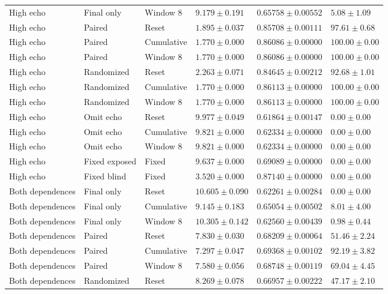\begin{longtable}{@{}llllll@{}}
High echo & Final only & Window 8 & $9.179 \pm 0.191$ & $0.65758 \pm 0.00552$ & $5.08 \pm 1.09$ \\
High echo & Paired & Reset & $1.895 \pm 0.037$ & $0.85708 \pm 0.00111$ & $97.61 \pm 0.68$ \\
High echo & Paired & Cumulative & $1.770 \pm 0.000$ & $0.86086 \pm 0.00000$ & $100.00 \pm 0.00$ \\
High echo & Paired & Window 8 & $1.770 \pm 0.000$ & $0.86086 \pm 0.00000$ & $100.00 \pm 0.00$ \\
High echo & Randomized & Reset & $2.263 \pm 0.071$ & $0.84645 \pm 0.00212$ & $92.68 \pm 1.01$ \\
High echo & Randomized & Cumulative & $1.770 \pm 0.000$ & $0.86113 \pm 0.00000$ & $100.00 \pm 0.00$ \\
High echo & Randomized & Window 8 & $1.770 \pm 0.000$ & $0.86113 \pm 0.00000$ & $100.00 \pm 0.00$ \\
High echo & Omit echo & Reset & $9.977 \pm 0.049$ & $0.61864 \pm 0.00147$ & $0.00 \pm 0.00$ \\
High echo & Omit echo & Cumulative & $9.821 \pm 0.000$ & $0.62334 \pm 0.00000$ & $0.00 \pm 0.00$ \\
High echo & Omit echo & Window 8 & $9.821 \pm 0.000$ & $0.62334 \pm 0.00000$ & $0.00 \pm 0.00$ \\
High echo & Fixed exposed & Fixed & $9.637 \pm 0.000$ & $0.69089 \pm 0.00000$ & $0.00 \pm 0.00$ \\
High echo & Fixed blind & Fixed & $3.520 \pm 0.000$ & $0.87140 \pm 0.00000$ & $0.00 \pm 0.00$ \\
Both dependences & Final only & Reset & $10.605 \pm 0.090$ & $0.62261 \pm 0.00284$ & $0.00 \pm 0.00$ \\
Both dependences & Final only & Cumulative & $9.145 \pm 0.183$ & $0.65054 \pm 0.00502$ & $8.01 \pm 4.00$ \\
Both dependences & Final only & Window 8 & $10.305 \pm 0.142$ & $0.62560 \pm 0.00439$ & $0.98 \pm 0.44$ \\
Both dependences & Paired & Reset & $7.830 \pm 0.030$ & $0.68209 \pm 0.00064$ & $51.46 \pm 2.24$ \\
Both dependences & Paired & Cumulative & $7.297 \pm 0.047$ & $0.69368 \pm 0.00102$ & $92.19 \pm 3.82$ \\
Both dependences & Paired & Window 8 & $7.580 \pm 0.056$ & $0.68748 \pm 0.00119$ & $69.04 \pm 4.45$ \\
Both dependences & Randomized & Reset & $8.269 \pm 0.078$ & $0.66957 \pm 0.00222$ & $47.17 \pm 2.10$ \\

\end{longtable}
